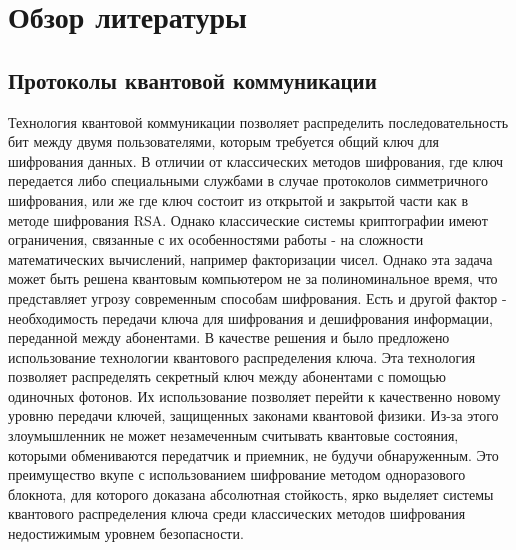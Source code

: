 \chapter{Обзор литературы}\label{ch:ch1}
\renewcommand{\thefigure}{1.\arabic{figure}} %
\setcounter{figure}{0}                     %
\renewcommand{\figurename}{Рисунок}

\section{Протоколы квантовой коммуникации}\label{sec:ch1/sect2}
Технология квантовой коммуникации позволяет распределить последовательность бит между двумя пользователями,  которым требуется общий ключ для шифрования данных. В отличии от классических методов шифрования, где ключ передается либо специальными службами в случае протоколов симметричного шифрования, или же где ключ состоит из открытой и закрытой части как в методе шифрования RSA. Однако классические системы криптографии имеют ограничения, связанные с их особенностями работы - на сложности математических  вычислений, например факторизации чисел. Однако эта задача может быть решена квантовым компьютером не за полиноминальное время, что представляет угрозу современным способам шифрования.  Есть и другой фактор - необходимость передачи ключа для шифрования и дешифрования информации, переданной между абонентами. 
В качестве решения и было предложено использование технологии квантового распределения ключа. Эта технология позволяет распределять секретный ключ между абонентами с помощью одиночных фотонов. Их использование позволяет перейти к качественно новому уровню передачи ключей, защищенных законами квантовой физики. Из-за этого злоумышленник не может незамеченным считывать квантовые состояния, которыми обмениваются передатчик и приемник, не будучи обнаруженным. Это преимущество вкупе с использованием шифрование методом одноразового блокнота, для которого доказана абсолютная стойкость, ярко выделяет системы квантового распределения ключа среди классических методов шифрования недостижимым уровнем безопасности. 


